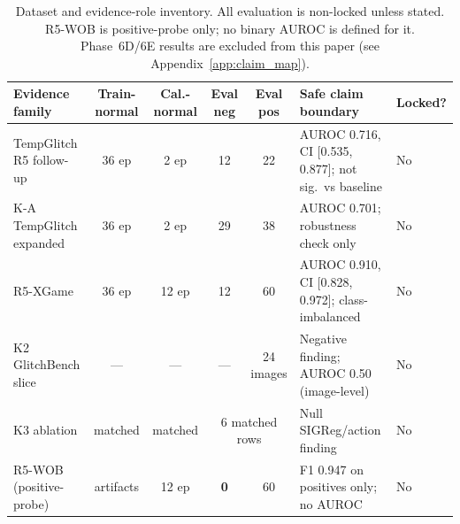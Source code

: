 \begin{table}[t]
\caption{Dataset and evidence-role inventory. All evaluation is non-locked unless stated.
R5-WOB is positive-probe only; no binary AUROC is defined for it. Phase~6D/6E results are
excluded from this paper (see Appendix~\ref{app:claim_map}).}
\label{tab:dataset-inventory}
\centering
\footnotesize
\setlength{\tabcolsep}{4pt}
\begin{tabularx}{\textwidth}{@{}lccccXl@{}}
\toprule
Evidence family & Train-normal & Cal.-normal & Eval neg & Eval pos & Safe claim boundary & Locked? \\
\midrule
TempGlitch R5 follow-up & 36 ep & 2 ep & 12 & 22 & AUROC 0.716, CI [0.535,\,0.877]; not sig.\ vs baseline & No \\
K-A TempGlitch expanded & 36 ep & 2 ep & 29 & 38 & AUROC 0.701; robustness check only & No \\
R5-XGame & 36 ep & 12 ep & 12 & 60 & AUROC 0.910, CI [0.828,\,0.972]; class-imbalanced & No \\
K2 GlitchBench slice & — & — & — & 24 images & Negative finding; AUROC 0.50 (image-level) & No \\
K3 ablation & matched & matched & \multicolumn{2}{c}{6 matched rows} & Null SIGReg/action finding & No \\
R5-WOB (positive-probe) & artifacts & 12 ep & \textbf{0} & 60 & F1 0.947 on positives only; no AUROC & No \\
\bottomrule
\end{tabularx}
\end{table}
